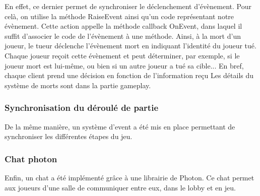         En effet, ce dernier permet de synchroniser le déclenchement d'évènement. Pour celà, on utilise la méthode RaiseEvent ainsi
        qu'un code représentant notre évènement. Cette action appelle la méthode callback OnEvent, dans laquel il suffit d'associer le
        code de l'évènement à une méthode. Ainsi, à la mort d'un joueur, le tueur déclenche l'évènement mort en indiquant l'identité du
        joueur tué. Chaque joueur reçoit cette évènement et peut déterminer, par exemple, si le joueur mort est lui-même, ou bien si un
        autre joueur a tué sa cible... En bref, chaque client prend une décision en fonction de l'information reçu
        Les détails du système de morts sont dans la partie gameplay.

    \subsubsection{Synchronisation du déroulé de partie}
        De la même manière, un système d'event a été mis en place permettant de synchroniser les différentes étapes du jeu.

    \subsubsection{Chat photon}
	Enfin, un chat a été implémenté grâce à une librairie de Photon. Ce chat permet aux joueurs d'une salle de communiquer entre
	eux, dans le lobby et en jeu.

